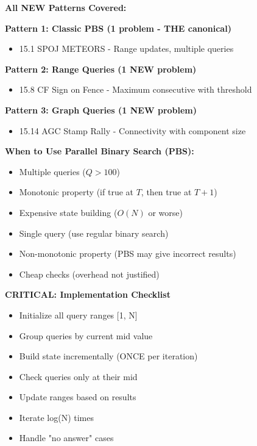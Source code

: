 \documentclass[11pt,a4paper,oneside]{book}
\begin{document}
\begin{tcolorbox}[
    enhanced,breakable,
    colback=primaryblue!10,
    colframe=primaryblue,
    boxrule=2pt,
    arc=4mm,
    title=\textbf{Parallel Binary Search: Complete Mastery}
]
\textbf{All NEW Patterns Covered:}

\textbf{Pattern 1: Classic PBS (1 problem - THE canonical)}
\begin{itemize}
\item 15.1 SPOJ METEORS - Range updates, multiple queries
\end{itemize}

\textbf{Pattern 2: Range Queries (1 NEW problem)}
\begin{itemize}
\item 15.8 CF Sign on Fence - Maximum consecutive with threshold
\end{itemize}

\textbf{Pattern 3: Graph Queries (1 NEW problem)}
\begin{itemize}
\item 15.14 AGC Stamp Rally - Connectivity with component size
\end{itemize}

\textbf{When to Use Parallel Binary Search (PBS):}

\begin{itemize}
\item[$\checkmark$] Multiple queries ($Q > 100$)
\item[$\checkmark$] Monotonic property (if true at $T$, then true at $T+1$)
\item[$\checkmark$] Expensive state building ($O(N)$ or worse)
\item[$\times$] Single query (use regular binary search)
\item[$\times$] Non-monotonic property (PBS may give incorrect results)
\item[$\times$] Cheap checks (overhead not justified)
\end{itemize}

\textbf{CRITICAL: Implementation Checklist}
\begin{itemize}
\item Initialize all query ranges [1, N]
\item Group queries by current mid value
\item Build state incrementally (ONCE per iteration)
\item Check queries only at their mid
\item Update ranges based on results
\item Iterate log(N) times
\item Handle "no answer" cases
\end{itemize}


\end{tcolorbox}
\end{document}
